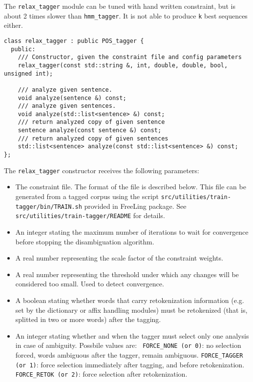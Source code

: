 \documentclass[a4paper]{book}
\begin{document}
  The {\tt relax\_tagger} module can be tuned with hand written
  constraint, but is about 2 times slower than {\tt hmm\_tagger}.
  It is not able to produce {\tt k} best sequences either.
\begin{verbatim}
class relax_tagger : public POS_tagger {
  public:
    /// Constructor, given the constraint file and config parameters
    relax_tagger(const std::string &, int, double, double, bool, unsigned int);

    /// analyze given sentence.
    void analyze(sentence &) const;
    /// analyze given sentences.
    void analyze(std::list<sentence> &) const;
    /// return analyzed copy of given sentence
    sentence analyze(const sentence &) const;
    /// return analyzed copy of given sentences
    std::list<sentence> analyze(const std::list<sentence> &) const;
};
\end{verbatim}

  The {\tt relax\_tagger} constructor receives the following parameters:
\begin{itemize}
\item The constraint file. The format of the file is described
  below. This file can be generated from a tagged corpus using the
  script {\tt src/utilities/train-tagger/bin/TRAIN.sh} provided in
  FreeLing package. See {\tt src/utilities/train-tagger/README} for details.
\item An integer stating the maximum number of iterations to wait for
   convergence before stopping the disambiguation algorithm.
\item A real number representing the scale factor of the constraint weights.
\item A real number representing the threshold under which any changes
  will be considered too small. Used to detect convergence.
\item A boolean stating whether words that carry retokenization
  information (e.g. set by the dictionary or affix handling modules)
  must be retokenized (that is, splitted in two or more words) after
  the tagging.
\item An integer stating whether and when the tagger must select only
  one analysis in case of ambiguity. Possbile values are: {\tt
    FORCE\_NONE (or 0)}: no selection forced, words ambiguous after
  the tagger, remain ambiguous.  {\tt FORCE\_TAGGER (or 1)}: force
  selection immediately after tagging, and before retokenization. {\tt
    FORCE\_RETOK (or 2)}: force selection after retokenization.
\end{itemize}
\end{document}
